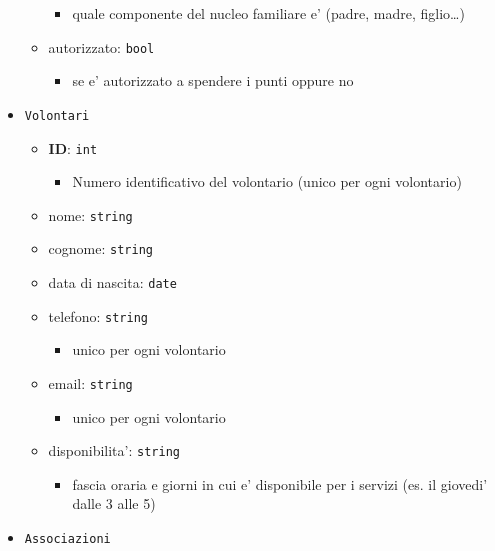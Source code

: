 \documentclass[]{article}
\providecommand{\tightlist}{%
  \setlength{\itemsep}{0pt}\setlength{\parskip}{0pt}}
\begin{document}
\begin{itemize}
\begin{itemize}
    \begin{itemize}
    \tightlist
    \item
      quale componente del nucleo familiare e' (padre, madre,
      figlio\ldots{})
    \end{itemize}
  \item
    autorizzato: \texttt{bool}

    \begin{itemize}
    \tightlist
    \item
      se e' autorizzato a spendere i punti oppure no
    \end{itemize}
  \end{itemize}
\item
  \texttt{Volontari}

  \begin{itemize}
  \tightlist
  \item
    \textbf{ID}: \texttt{int}

    \begin{itemize}
    \tightlist
    \item
      Numero identificativo del volontario (unico per ogni volontario)
    \end{itemize}
  \item
    nome: \texttt{string}
  \item
    cognome: \texttt{string}
  \item
    data di nascita: \texttt{date}
  \item
    telefono: \texttt{string}

    \begin{itemize}
    \tightlist
    \item
      unico per ogni volontario
    \end{itemize}
  \item
    email: \texttt{string}

    \begin{itemize}
    \tightlist
    \item
      unico per ogni volontario
    \end{itemize}
  \item
    disponibilita': \texttt{string}

    \begin{itemize}
    \tightlist
    \item
      fascia oraria e giorni in cui e' disponibile per i servizi (es. il
      giovedi' dalle 3 alle 5)
    \end{itemize}
  \end{itemize}
\item
  \texttt{Associazioni}


\end{itemize}
\end{document}
